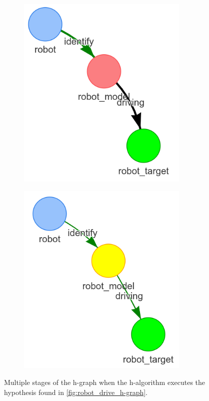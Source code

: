 \begin{figure}[H]
\begin{subfigure}{.3\textwidth}
    \includegraphics[width=0.9\textwidth]{figures/proposed_method/connecting_nodes/robot_to_target/execute_robot_to_target_2}
    \end{subfigure}
    \begin{subfigure}{.3\textwidth}
    \centering
    \includegraphics[width=0.9\textwidth]{figures/proposed_method/connecting_nodes/robot_to_target/execute_robot_to_target_3}
    \end{subfigure}
    \caption{Multiple stages of the \ac{h-graph} when the \ac{h-algorithm} executes the hypothesis found in \cref{fig:robot_drive_h-graph}.}
    \label{fig:execute_robot_to_target}
\end{figure}

